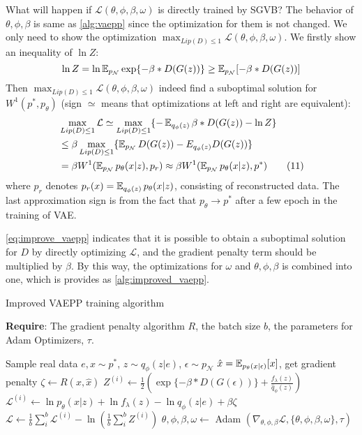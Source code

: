 What will happen if $\mathcal{L}(\theta, \phi, \beta, \omega)$ is directly trained by SGVB? The behavior of $\theta, \phi, \beta$ is same as \cref{alg:vaepp} since the optimization for them is not changed. We only need to show the optimization $\max_{Lip(D) \leq 1} \mathcal{L}(\theta, \phi, \beta, \omega)$. We firstly show an inequality of $\ln Z$:
\begin{equation*}
	\ln Z = \ln \operatorname{\mathbb{E}}_{p_\mathcal{N}} \exp \{- \beta * D(G(z))\} \geq \operatorname{\mathbb{E}}_{p_\mathcal{N}} [- \beta * D(G(z))]
\end{equation*}
Then $\max_{Lip(D) \leq 1} \mathcal{L}(\theta, \phi, \beta, \omega)$ indeed find a suboptimal solution for $W^1(p^*, p_\theta)$ (sign $\simeq$ means that optimizations at left and right are equivalent):
\begin{align*}\label{eq:improve_vaepp}
	&\max_{Lip(D) \leq 1} \mathcal{L} \simeq \max_{Lip(D) \leq 1} \{ -\operatorname{\mathbb{E}}_{q_\phi(z)} \beta*D(G(z)) - \ln Z \}\\ 
	&\leq \beta \max_{Lip(D) \leq 1} \{ \operatorname{\mathbb{E}}_{p_\mathcal{N}} D(G(z)) - E_{q_\phi(z)} D(G(z)) \} \\
	&= \beta W^1(\operatorname{\mathbb{E}}_{p_\mathcal{N}}p_\theta(x|z), p_r) \approx \beta W^1(\operatorname{\mathbb{E}}_{p_\mathcal{N}}p_\theta(x|z), p^*) \tag{11}
\end{align*}
where $p_r$ denotes $p_r(x) = \operatorname{\mathbb{E}}_{q_\phi(z)} p_\theta(x|z)$, consisting of reconstructed data. The last approximation sign is from the fact that $p_\theta \rightarrow p^*$ after a few epoch in the training of VAE. 

\cref{eq:improve_vaepp} indicates that it is possible to obtain a suboptimal solution for $D$ by directly optimizing $\mathcal{L}$, and the gradient penalty term should be multiplied by $\beta$. By this way, the optimizations for $\omega$ and $\theta, \phi, \beta$ is combined into one, which is provides as \cref{alg:improved_vaepp}. 
\begin{algorithm}[tb]
\caption{Improved VAEPP training algorithm}
\label{alg:improved_vaepp}
\textbf{Require}: The gradient penalty algorithm $R$, the batch size $b$, the parameters for Adam Optimizers, $\tau$. 

\begin{algorithmic}[1] %
\STATE Sample real data $e, x \sim p^*$, $z \sim q_\phi(z|e)$, $\epsilon \sim p_\mathcal{N}$
\STATE $\hat{x} = \operatorname{\mathbb{E}}_{p_\theta(x|\epsilon)}[x]$, get gradient penalty $\zeta \gets R(x, \hat{x})$ 
\STATE $Z^{(i)} \gets \frac{1}{2}(\exp\{-\beta * D(G(\epsilon))\} + \frac{f_\lambda(z)}{\hat{q}_\phi(z)})$
\STATE $\mathcal{L}^{(i)} \gets \ln p_\theta(x|z) + \ln f_\lambda(z) - \ln q_\phi(z|e) + \beta \zeta$
\ENDFOR
\STATE $\mathcal{L} \gets \frac{1}{b}\sum_{i}^b \mathcal{L}^{(i)} - \ln (\frac{1}{b}\sum_{i}^b Z^{(i)})$
\STATE $\theta, \phi, \beta, \omega \gets $ Adam $(\nabla_{\theta, \phi, \beta} \mathcal{L}, \{\theta, \phi, \beta, \omega\}, \tau)$
\ENDWHILE
\end{algorithmic}
\end{algorithm}

